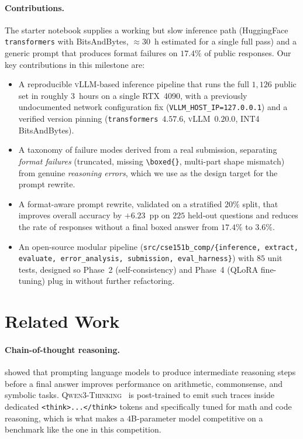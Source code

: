 \documentclass{article}
\begin{document}
\paragraph{Contributions.}
The starter notebook supplies a working but slow inference path
(HuggingFace \texttt{transformers} with BitsAndBytes, $\approx 30$~h
estimated for a single full pass) and a generic prompt that produces
format failures on $17.4\%$ of public responses. Our key contributions
in this milestone are:
\begin{itemize}
  \item A reproducible \textsc{vLLM}-based inference pipeline that runs
        the full $1{,}126$ public set in roughly $3$~hours on a single
        RTX~4090, with a previously undocumented network configuration
        fix (\verb|VLLM_HOST_IP=127.0.0.1|) and a verified version
        pinning (\texttt{transformers}~$4.57.6$,
        \textsc{vLLM}~$0.20.0$, INT4 BitsAndBytes).
  \item A taxonomy of failure modes derived from a real submission,
        separating \emph{format failures} (truncated, missing
        \verb|\boxed{}|, multi-part shape mismatch) from genuine
        \emph{reasoning errors}, which we use as the design target for
        the prompt rewrite.
  \item A format-aware prompt rewrite, validated on a stratified $20\%$
        split, that improves overall accuracy by $+6.23$~pp on $225$
        held-out questions and reduces the rate of responses without a
        final boxed answer from $17.4\%$ to $3.6\%$.
  \item An open-source modular pipeline
        (\texttt{src/cse151b\_comp/\{inference, extract, evaluate,
        error\_analysis, submission, eval\_harness\}}) with $85$ unit
        tests, designed so Phase~2 (self-consistency) and Phase~4
        (QLoRA fine-tuning) plug in without further refactoring.
\end{itemize}


\section{Related Work}
\label{sec:relatedwork}

\paragraph{Chain-of-thought reasoning.}
\citet{wei2022chain} showed that prompting language models to produce
intermediate reasoning steps before a final answer improves performance
on arithmetic, commonsense, and symbolic tasks.
\textsc{Qwen3-Thinking}~\citep{qwen3technical} is post-trained to emit
such traces inside dedicated \verb|<think>...</think>| tokens and
specifically tuned for math and code reasoning, which is what makes a
$4$B-parameter model competitive on a benchmark like the one in this
competition.
\end{document}
